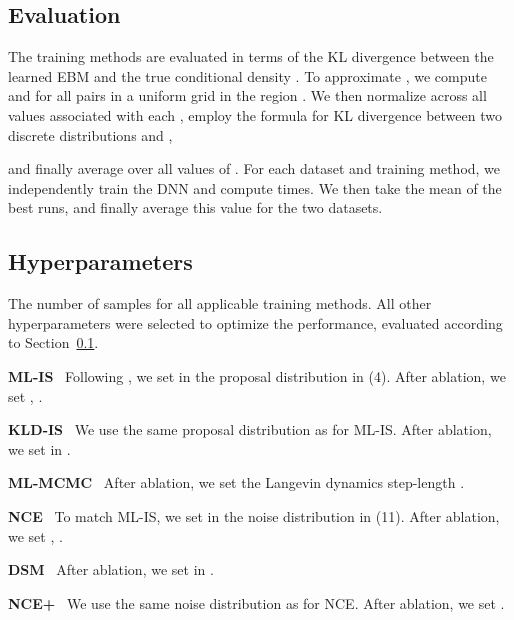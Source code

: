 \documentclass{bmvc2k}
\newcommand{\parsection}[1]{\vspace{2mm}\noindent\textbf{#1}~ }
\begin{document}
\begin{appendices}
\subsection{Evaluation}
\label{section:1dregression_evaluation}
The training methods are evaluated in terms of the KL divergence  between the learned EBM  and the true conditional density . To approximate , we compute  and  for all  pairs in a  uniform grid in the region . We then normalize across all values associated with each , employ the formula for KL divergence between two discrete distributions  and ,

and finally average over all  values of . For each dataset and training method, we independently train the DNN  and compute   times. We then take the mean of the  best runs, and finally average this value for the two datasets.













\subsection{Hyperparameters}
The number of samples  for all applicable training methods. All other hyperparameters were selected to optimize the performance, evaluated according to Section~\ref{section:1dregression_evaluation}.


\parsection{ML-IS}
Following \cite{gustafsson2019learning}, we set  in the proposal distribution  in (4). After ablation, we set , . 


\parsection{KLD-IS}
We use the same proposal distribution  as for ML-IS. After ablation, we set  in .


\parsection{ML-MCMC}
After ablation, we set the Langevin dynamics step-length .


\parsection{NCE}
To match ML-IS, we set  in the noise distribution  in (11). After ablation, we set , . 


\parsection{DSM}
After ablation, we set  in .


\parsection{NCE+}
We use the same noise distribution  as for NCE. After ablation, we set .














\end{appendices}
\end{document}
